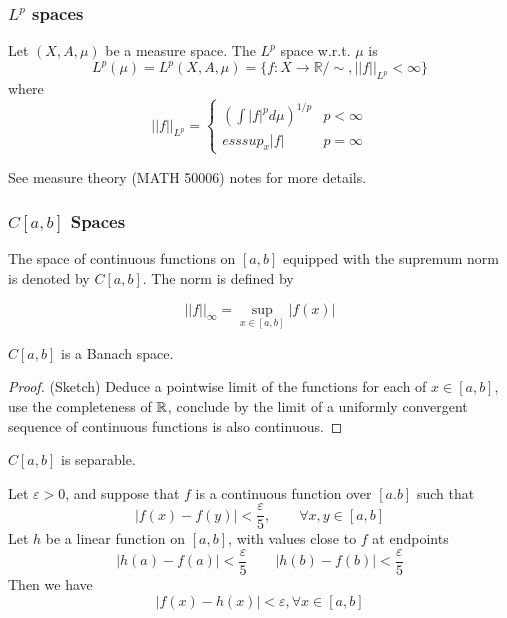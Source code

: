 \documentclass{article}
\begin{document}
\subsubsection*{$L^p$ spaces}  
Let $(X,A,\mu)$ be a measure space. The $L^p$ space w.r.t. $\mu$ is 
$$L^p(\mu) = L^p(X,A,\mu) = \{f:X \to \mathbb{R}/\sim, ||f||_{L^p} < \infty \}$$
where 
\begin{equation*}
    ||f||_{L^p} =\begin{cases}
    ( \int |f|^p d\mu)^{1/p} &  p<\infty \\
    esssup_{x} |f| & p=\infty
\end{cases}
\end{equation*}


See measure theory (MATH 50006) notes for more details.  

\subsubsection*{$C[a,b]$ Spaces}  

The space of continuous functions on $[a,b]$ equipped with the supremum norm is denoted by $C[a,b]$.  
The norm is defined by   

\begin{equation*}
    ||f||_{\infty}=\sup_{x \in [a,b]} |f(x)|
\end{equation*}

\begin{prop}
    $C[a,b]$ is a Banach space.
\end{prop}  
\begin{proof}
(Sketch)  
Deduce a pointwise limit of the functions for each of $x\in [a,b]$, use the completeness of $\mathbb{R}$, conclude by the limit of a uniformly convergent sequence of continuous functions is also continuous.  
\end{proof}

\begin{thm}
    \label{continuous sep}
    $C[a,b]$ is separable.
\end{thm}  

\begin{lemma}
    Let $\varepsilon >0$, and suppose that $f$ is a continuous function over $[a.b]$ such that  
    \begin{equation*}
        |f(x)-f(y)|<\frac{\varepsilon}{5}, \qquad \forall x,y \in [a,b]
    \end{equation*}  
    Let $h$ be a linear function on $[a,b]$, with values close to $f$ at endpoints  
    \begin{equation*}
        |h(a)-f(a)|<\frac{\varepsilon}{5} \qquad |h(b)-f(b)|<\frac{\varepsilon}{5}
    \end{equation*}  
    Then we have  
    \begin{equation*}
        |f(x)-h(x)| < \varepsilon, \forall x \in [a,b]
    \end{equation*}
\end{lemma}  
\end{document}
